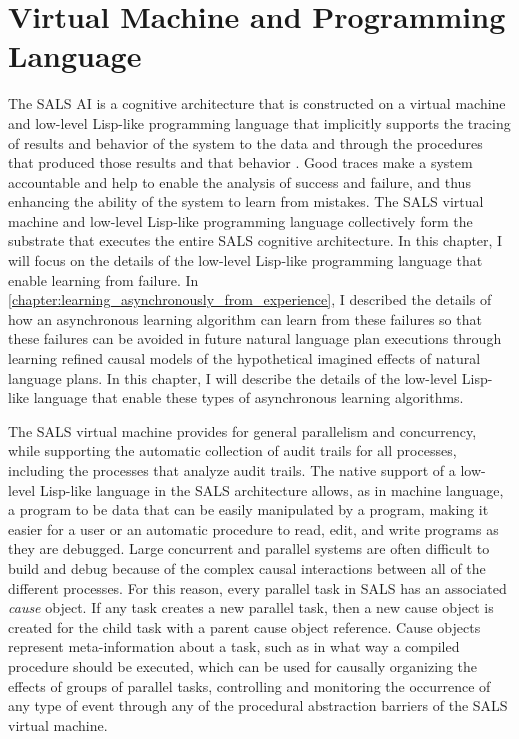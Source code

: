 \chapter{Virtual Machine and Programming Language}
\label{chapter:virtual_machine_and_programming_language}

The SALS AI is a cognitive architecture that is constructed on a
virtual machine and low-level Lisp-like programming language that
implicitly supports the tracing of results and behavior of the system
to the data and through the procedures that produced those results and
that behavior \cite[]{morgan:2009}.  Good traces make a system
accountable and help to enable the analysis of success and failure,
and thus enhancing the ability of the system to learn from mistakes.
The SALS virtual machine and low-level Lisp-like programming language
collectively form the substrate that executes the entire SALS
cognitive architecture.  In this chapter, I will focus on the details
of the low-level Lisp-like programming language that enable learning
from failure.  In
{\mbox{\autoref{chapter:learning_asynchronously_from_experience}}}, I
described the details of how an asynchronous learning algorithm can
learn from these failures so that these failures can be avoided in
future natural language plan executions through learning refined
causal models of the hypothetical imagined effects of natural language
plans.  In this chapter, I will describe the details of the low-level
Lisp-like language that enable these types of asynchronous learning
algorithms.

The SALS virtual machine provides for general parallelism and
concurrency, while supporting the automatic collection of audit trails
for all processes, including the processes that analyze audit trails.
The native support of a low-level Lisp-like language in the SALS
architecture allows, as in machine language, a program to be data that
can be easily manipulated by a program, making it easier for a user or
an automatic procedure to read, edit, and write programs as they are
debugged.  Large concurrent and parallel systems are often difficult
to build and debug because of the complex causal interactions between
all of the different processes.  For this reason, every parallel task
in SALS has an associated {\emph{cause}} object.  If any task creates
a new parallel task, then a new cause object is created for the child
task with a parent cause object reference.  Cause objects represent
meta-information about a task, such as in what way a compiled
procedure should be executed, which can be used for causally
organizing the effects of groups of parallel tasks, controlling and
monitoring the occurrence of any type of event through any of the
procedural abstraction barriers of the SALS virtual machine.

